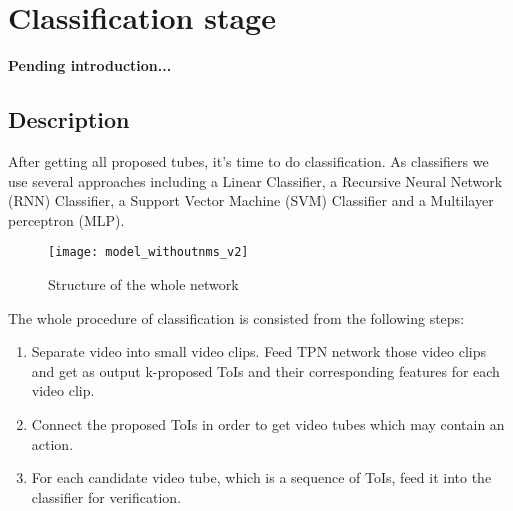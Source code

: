 



% 

\chapter{Classification stage}
\textbf{Pending introduction...}
\section{Description}
After getting all proposed tubes, it's time to do classification. As classifiers we use several approaches including a Linear Classifier, 
a Recursive Neural Network (RNN) Classifier, a Support Vector Machine (SVM) Classifier and a Multilayer perceptron (MLP).

\begin{figure}[h]
  \centering
  \texttt{[image: model\_withoutnms\_v2]}
  \caption{Structure of the whole network}
  \label{fig:whole_network}
\end{figure}

The whole procedure of classification is consisted from the following steps:
\begin{enumerate}
\item Separate video into small video clips. Feed TPN network those video clips and get as output
  k-proposed ToIs and their corresponding features for each video clip.
\item Connect the proposed ToIs in order to get video tubes which may contain an action.
\item For each candidate video tube, which is a sequence of ToIs, feed it into the classifier
  for verification.
\end{enumerate}

